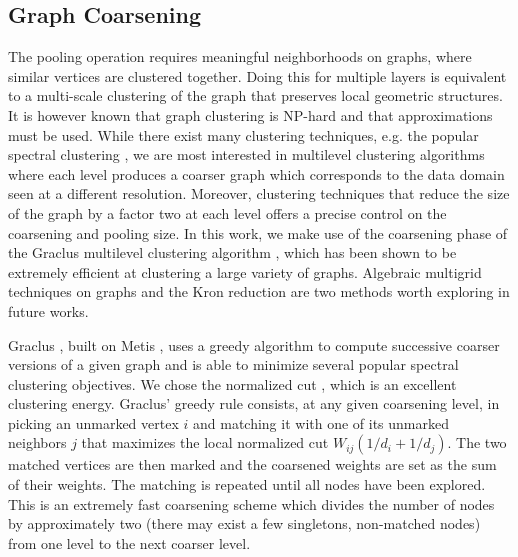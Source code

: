 \documentclass{article}
\newcommand{\todo}[1]{{\color{red} #1 }}
\begin{document}
\subsection{Graph Coarsening} \label{sec:coarsening}


The pooling operation requires meaningful neighborhoods on graphs, where
similar vertices are clustered together. Doing this for multiple layers is
equivalent to a multi-scale clustering of the graph that preserves local
geometric structures. It is however known that graph clustering is
\mbox{NP-hard} \cite{art:BuiJonesGraphPartNPhard} and that approximations must
be used. While there exist many clustering techniques, e.g. the popular
spectral clustering \cite{art:VonLuxburg07Tutorial}, we are most interested in
multilevel clustering algorithms where each level produces a coarser graph
which corresponds to the data domain seen at a different resolution.  Moreover,
clustering techniques that reduce the size of the graph by a factor two at each
level offers a precise control on the coarsening and pooling size.  In this
work, we make use of the coarsening phase of the Graclus multilevel clustering
algorithm \cite{art:DhillonGuanKulis07Graclus}, which has been shown to be
extremely efficient at clustering a large variety of graphs. Algebraic
multigrid techniques on graphs \cite{art:RonSafroBrandt11MultigridGraph} and
the Kron reduction \cite{art:ShumanFarajiVandergheynst16PyramTrans} are two
methods worth exploring in future works.

Graclus \cite{art:DhillonGuanKulis07Graclus}, built on Metis
\cite{art:KarypisKumar98Metis}, uses a greedy algorithm to compute successive
coarser versions of a given graph and is able to minimize several popular
spectral clustering objectives. We chose the normalized cut
\cite{art:ShiMalik00NCut}, which is an excellent clustering energy. Graclus'
greedy rule consists, at any given coarsening level, in picking an unmarked
vertex $i$ and matching it with one of its unmarked neighbors $j$ that
maximizes the local normalized cut $W_{ij} (1/d_i + 1/d_j)$.  The two matched
vertices are then marked and the coarsened weights are set as the sum of their
weights. The matching is repeated until all nodes have been explored. This is
an extremely fast coarsening scheme which divides the number of nodes by
approximately two (there may exist a few singletons, non-matched nodes) from
one level to the next coarser level.
\end{document}
